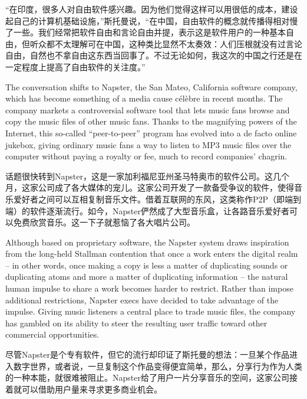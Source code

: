 \ifdefined\chs
``在印度，很多人对自由软件感兴趣。因为他们觉得这样可以用很低的成本，建设起自己的计算机基础设施，''斯托曼说，``在中国，自由软件的概念就传播得相对慢了一些。我们经常把软件自由和言论自由并提，表示这是软件用户的一种基本自由，\ifdefined\nov 但听众都不太理解\fi\ifdefined\spv 可在中国，这种类比显然不太奏效：人们压根就没有过言论自由，自然也不拿自由这东西当回事了\fi 。不过无论如何，我这次的中国之行还是在一定程度上提高了自由软件的关注度。''
\fi

\ifdefined\eng
The conversation shifts to Napster, the San Mateo, California software company, which has become something of a media cause célèbre in recent months. The company markets a controversial software tool that lets music fans browse and copy the music files of other music fans. Thanks to the magnifying powers of the Internet, this so-called ``peer-to-peer'' program has evolved into a de facto online jukebox, giving ordinary music fans a way to listen to MP3 music files over the computer without paying a royalty or fee, much to record companies' chagrin.
\fi

\ifdefined\chs
话题很快转到Napster，这是一家加利福尼亚州圣马特奥市的软件公司。这几个月，这家公司成了各大媒体的宠儿。这家公司开发了一款备受争议的软件，使得音乐爱好者之间可以互相复制音乐文件。借着互联网的东风，这类称作P2P（即端到端）的软件逐渐流行。如今，Napster俨然成了大型音乐盒，让各路音乐爱好者可以免费欣赏音乐。这一下子就惹恼了各大唱片公司。
\fi

\ifdefined\eng
Although based on proprietary software, the Napster system draws inspiration from the long-held Stallman contention that once a work enters the digital realm -- in other words, once making a copy is less a matter of duplicating sounds or duplicating atoms and more a matter of duplicating information -- the natural human impulse to share a work becomes harder to restrict. Rather than impose additional restrictions, Napster execs have decided to take advantage of the impulse. Giving music listeners a central place to trade music files, the company has gambled on its ability to steer the resulting user traffic toward other commercial opportunities.
\fi

\ifdefined\chs
尽管Napster是个专有软件，但它的流行却印证了斯托曼的想法：一旦某个作品进入数字世界，或者说，一旦复制这个作品变得便宜简单，那么，分享行为作为人类的一种本能，就很难被阻止。Napster给了用户一片分享音乐的空间，这家公司接着就可以借助用户量来寻求更多商业机会。
\fi

